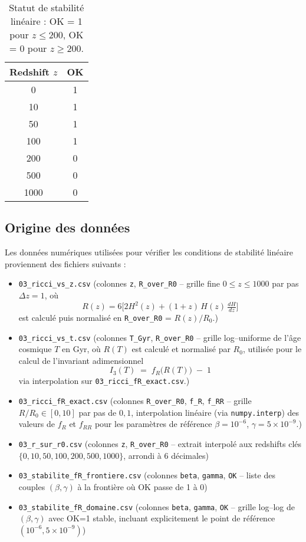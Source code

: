 \begin{table}[htbp]
  \centering
  \begin{tabular}{c c}
    \toprule
    Redshift \(z\) & OK \\
    \midrule
    0    & 1 \\
    10   & 1 \\
    50   & 1 \\
    100  & 1 \\
    200  & 0 \\
    500  & 0 \\
    1000 & 0 \\
    \bottomrule
  \end{tabular}
  \caption{Statut de stabilité linéaire : OK = 1 pour \(z \le 200\), OK = 0 pour \(z \ge 200\).}
  \label{tab:controle_rapide}
\end{table}

\subsection{Origine des données}

Les données numériques utilisées pour vérifier les conditions de stabilité linéaire proviennent des fichiers suivants :

\begin{itemize}
  \item \texttt{03\_ricci\_vs\_z.csv}
    (colonnes \texttt{z}, \texttt{R\_over\_R0} – grille fine $0\le z\le1000$ par pas $\Delta z=1$,
    où
    \[
    R(z)=6\bigl[2H^2(z)+(1+z)\,H(z)\,\tfrac{dH}{dz}\bigr]
    \]
    est calculé puis normalisé en \texttt{R\_over\_R0} = \(R(z)/R_0\).)
  \item \texttt{03\_ricci\_vs\_t.csv}
    (colonnes \texttt{T\_Gyr}, \texttt{R\_over\_R0} – grille log–uniforme de l’âge cosmique $T$ en Gyr, où $R(T)$ est calculé et normalisé par $R_0$, utilisée pour le calcul de l’invariant adimensionnel
    \[
     I_{3}(T) \;=\; f_{R}\bigl(R(T)\bigr)\;-\;1
    \]
    via interpolation sur \texttt{03\_ricci\_fR\_exact.csv}.)
  \item \texttt{03\_ricci\_fR\_exact.csv}
    (colonnes \texttt{R\_over\_R0}, \texttt{f\_R}, \texttt{f\_RR} – grille $R/R_0\in[0,10]$ par pas de $0{,}1$,
    interpolation linéaire (via \texttt{numpy.interp}) des valeurs de \(f_R\) et \(f_{RR}\)
     pour les paramètres de référence $\beta=10^{-6}$, $\gamma=5\times10^{-9}$.)
  \item \texttt{03\_r\_sur\_r0.csv}
    (colonnes \texttt{z}, \texttt{R\_over\_R0} – extrait interpolé aux redshifts clés $\{0,10,50,100,200,500,1000\}$, arrondi à 6 décimales)
  \item \texttt{03\_stabilite\_fR\_frontiere.csv}
    (colonnes \texttt{beta}, \texttt{gamma}, \texttt{OK} – liste des couples $(\beta,\gamma)$ à la frontière où OK passe de 1 à 0)
  \item \texttt{03\_stabilite\_fR\_domaine.csv}
    (colonnes \texttt{beta}, \texttt{gamma}, \texttt{OK} – grille log–log de $(\beta,\gamma)$ avec OK=1 stable, incluant explicitement le point de référence $(10^{-6},5\times10^{-9})$)
\end{itemize}

